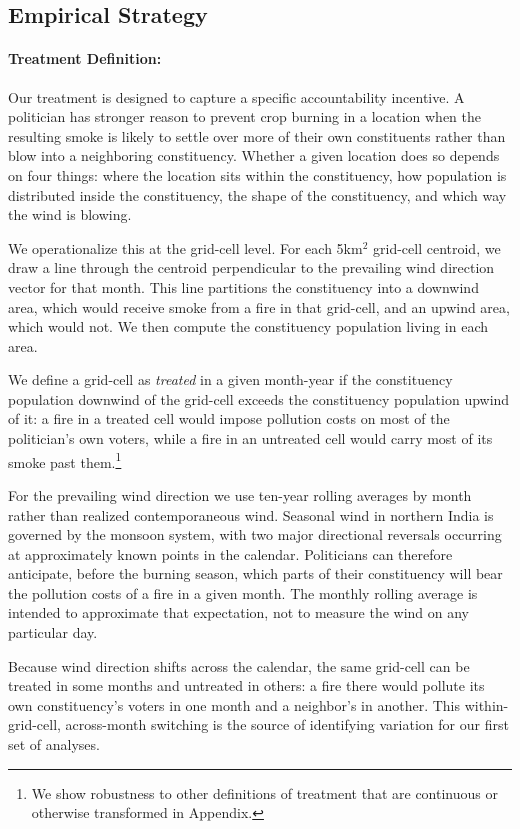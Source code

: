 \documentclass[12pt]{article}
\begin{document}
\subsection{Empirical Strategy}\label{ssec:empirical1}


\paragraph{Treatment Definition:}

Our treatment is designed to capture a specific accountability incentive. A politician has stronger reason to prevent crop burning in a location when the resulting smoke is likely to settle over more of their own constituents rather than blow into a neighboring constituency. Whether a given location does so depends on four things: where the location sits within the constituency, how population is distributed inside the constituency, the shape of the constituency, and which way the wind is blowing.

We operationalize this at the grid-cell level. For each 5km$^2$ grid-cell centroid, we draw a line through the centroid perpendicular to the prevailing wind direction vector for that month. This line partitions the constituency into a downwind area, which would receive smoke from a fire in that grid-cell, and an upwind area, which would not. We then compute the constituency population living in each area. 

We define a grid-cell as \textit{treated} in a given month-year if the constituency population downwind of the grid-cell exceeds the constituency population upwind of it: a fire in a treated cell would impose pollution costs on most of the politician's own voters, while a fire in an untreated cell would carry most of its smoke past them.\footnote{We show robustness to other definitions of treatment that are continuous or otherwise transformed in Appendix.}

For the prevailing wind direction we use ten-year rolling averages by month rather than realized contemporaneous wind. Seasonal wind in northern India is governed by the monsoon system, with two major directional reversals occurring at approximately known points in the calendar. Politicians can therefore anticipate, before the burning season, which parts of their constituency will bear the pollution costs of a fire in a given month. The monthly rolling average is intended to approximate that expectation, not to measure the wind on any particular day.

Because wind direction shifts across the calendar, the same grid-cell can be treated in some months and untreated in others: a fire there would pollute its own constituency's voters in one month and a neighbor's in another. This within-grid-cell, across-month switching is the source of identifying variation for our first set of analyses.
\end{document}

